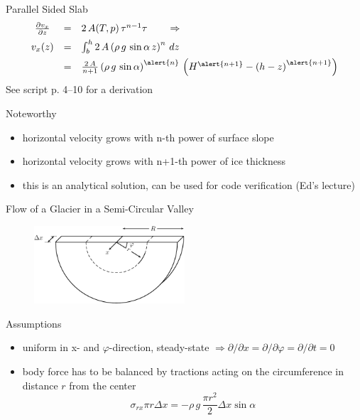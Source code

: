 \documentclass[hide notes,intlimits,unknownkeysallowed]{beamer}
\begin{document}
\begin{frame}{Parallel Sided Slab}
\begin{equation*}
    \begin{array}{ccl}
      \frac{\partial v_x}{\partial z}  & = &  2\,A(T,p)\,\tau^{n-1}\tau \qquad \Rightarrow \\[.5em]
      v_x (z) &  = & \int_{b}^{h} 2\,A\left(\rho\,g\,\sin{\alpha}\,z\right)^{n}\,dz \\[.5em]
& = &\frac{2\,A}{n+1} \left(\rho\,g\,\sin{\alpha}\right)^{\alert{n}}\,\left(H^{\alert{n+1}} - \left(h-z\right)^{\alert{n+1}}\right)
    \end{array}
  \end{equation*}
See script p. 4--10 for a derivation
\begin{block}{Noteworthy}
\begin{itemize}
\item horizontal velocity grows with \alert{n}-th power of surface slope
\item horizontal velocity grows with \alert{n+1}-th power of ice thickness
\item this is an analytical solution, can be used for code verification (Ed's lecture)
\end{itemize}
\end{block}
\end{frame}

\begin{frame}{Flow of a Glacier in a Semi-Circular Valley}
  \vspace{-1em}
  \begin{figure}
    \centering
    \includegraphics[width=0.5\textwidth]{figures/fig_channel}
    \label{fig:valley-glacier-coord}
  \end{figure}
  \begin{block}{Assumptions}
    \begin{itemize}
    \item uniform in x- and $\varphi$-direction, steady-state $\Rightarrow \partial / \partial x = \partial / \partial \varphi = \partial / \partial t = 0$
    \item body force has to be balanced by tractions acting on the circumference in distance $r$ from the center
      \begin{equation*}
        \sigma_{rx} \pi r \Delta x = - \rho\,g\,\frac{\pi r^2}{2} \Delta x \sin \alpha
      \end{equation*}
\end{itemize}
  \end{block}
\end{frame}
\end{document}
